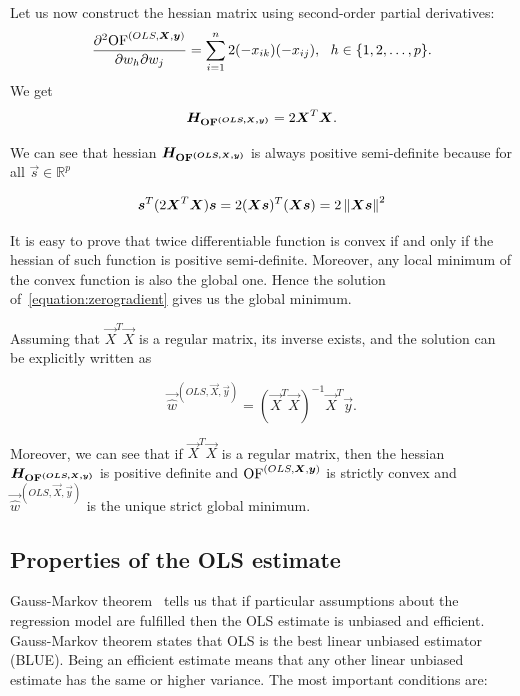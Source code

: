 Let us now construct the hessian matrix using second-order partial derivatives:
\begin{equation}
    \frac{\partial^2{\operatorname{OF}^{(OLS,\boldsymbol{X}, \boldsymbol{y})}} }{\partial w_h\partial w_j} = \sum\limits_{i=1}^n 2(- x_{ik})(-x_{ij}) \\, \ \ h \in \{{1,2,\ldots,p\}}. 
\end{equation}
We get 
\begin{equation}
    \boldsymbol{H_{\operatorname{OF}^{(OLS,\boldsymbol{X}, \boldsymbol{y})}}} = 2\boldsymbol{X}^T\boldsymbol{X}.
\end{equation}

We can see that hessian $\boldsymbol{H_{\operatorname{OF}^{(OLS,\boldsymbol{X}, \boldsymbol{y})}}}$ is always positive semi-definite because for all $\vec{s} \in \mathbb{R}^p$

\begin{equation}
    \boldsymbol{s}^T(2\boldsymbol{X}^T\boldsymbol{X})\boldsymbol{s} = 2(\boldsymbol{X}\boldsymbol{s})^T(\boldsymbol{X}\boldsymbol{s}) =  2 \left\lVert\boldsymbol{X}\boldsymbol{s}\right\rVert^2
\end{equation}

It is easy to prove that twice differentiable function is convex if and only if the hessian of such function is positive semi-definite. Moreover, any local minimum of the convex function is also the global one. Hence the solution of~\eqref{equation:zerogradient} gives us the global minimum. 

Assuming that $\vec{X}^T\vec{X}$ is a regular matrix, its inverse exists, and the solution can be explicitly written as

\begin{equation} \label{wols}
    \vec{\hat{w}}^{(OLS,\vec{X}, \vec{y})} = (\vec{X}^T\vec{X})^{-1}\vec{X}^T\vec{y}.
\end{equation}

Moreover, we can see that if $\vec{X}^T\vec{X}$ is a regular matrix, then the hessian $\boldsymbol{H_{\operatorname{OF}^{(OLS,\boldsymbol{X}, \boldsymbol{y})}}}$ is positive definite and $\operatorname{OF}^{(OLS,\boldsymbol{X}, \boldsymbol{y})}$ is strictly convex and $\vec{\hat{w}}^{(OLS,\vec{X}, \vec{y})}$ is the unique strict global minimum.


\subsection{Properties of the OLS estimate}
Gauss-Markov theorem~\cite{mccullagh2018generalized} tells us that if particular assumptions about the regression model are fulfilled then the OLS estimate is unbiased and efficient. Gauss-Markov theorem states that OLS is the best linear unbiased estimator (BLUE). Being an efficient estimate means that any other linear unbiased estimate has the same or higher variance. The most important conditions are:

